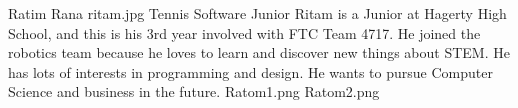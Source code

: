 \insertbio
{Ratim Rana}
{ritam.jpg}
{Tennis}
{Software}
{Junior}
{
Ritam is a Junior at Hagerty High School, and this is his 3rd year involved with FTC Team 4717. He joined the robotics team because he loves to learn and discover new things about STEM. He has lots of interests in programming and design. He wants to pursue Computer Science and business in the future.
}
{Ratom1.png}
{Ratom2.png}

